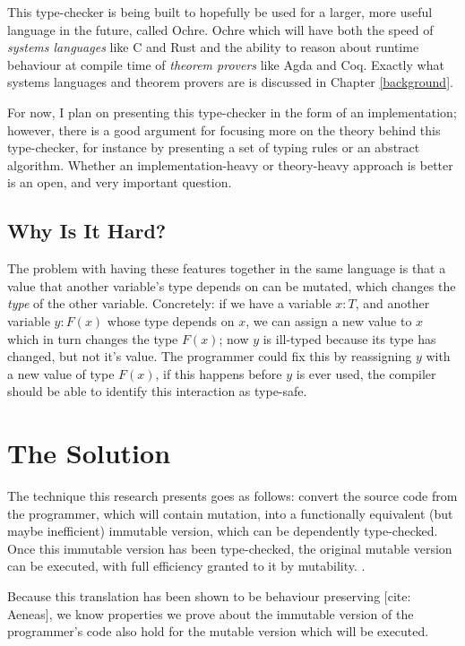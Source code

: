 \documentclass[12pt,twoside]{report}
\begin{document}
This type-checker is being built to hopefully be used for a larger, more useful language in the future, called Ochre. Ochre which will have both the speed of \textit{systems languages} like C and Rust and the ability to reason about runtime behaviour at compile time of \textit{theorem provers} like Agda and Coq. Exactly what systems languages and theorem provers are is discussed in Chapter \ref{background}.

For now, I plan on presenting this type-checker in the form of an implementation; however, there is a good argument for focusing more on the theory behind this type-checker, for instance by presenting a set of typing rules or an abstract algorithm. Whether an implementation-heavy or theory-heavy approach is better is an open, and very important question.

\subsection{Why Is It Hard?}
The problem with having these features together in the same language is that a value that another variable's type depends on can be mutated, which changes the \textit{type} of the other variable. Concretely: if we have a variable $x: T$, and another variable $y: F(x)$ whose type depends on $x$, we can assign a new value to $x$ which in turn changes the type $F(x)$; now $y$ is ill-typed because its type has changed, but not it's value. The programmer could fix this by reassigning $y$ with a new value of type $F(x)$, if this happens before $y$ is ever used, the compiler should be able to identify this interaction as type-safe.

\section{The Solution}
\label{thesolution}
The technique this research presents goes as follows: convert the source code from the programmer, which will contain mutation, into a functionally equivalent (but maybe inefficient) immutable version, which can be dependently type-checked. Once this immutable version has been type-checked, the original mutable version can be executed, with full efficiency granted to it by mutability. .

Because this translation has been shown to be behaviour preserving [cite: Aeneas], we know properties we prove about the immutable version of the programmer's code also hold for the mutable version which will be executed.
\end{document}
